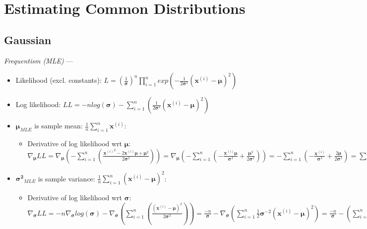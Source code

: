 \section{Estimating Common Distributions}
\subsection*{Gaussian}
\emph{Frequentism (MLE)} --- 
\begin{itemize}
    \item Likelihood (excl. constants): $L = (\frac{1}{\boldsymbol{\sigma}})^n \prod_{i=1}^n exp( -\frac{1}{2\boldsymbol{\sigma}^2} (\boldsymbol{x}^{(i)} - \boldsymbol{\mu} )^2)$
    \item Log likelihood: $LL = -n log(\boldsymbol{\sigma}) - \sum_{i=1}^n (\frac{1}{2\boldsymbol{\sigma}^2} (\boldsymbol{x}^{(i)} - \boldsymbol{\mu} )^2)$
    \item $\boldsymbol{\mu}_{MLE}$ is sample mean: $ \frac{1}{n}\sum_{i=1}^n \boldsymbol{x}^{(i)}$:
    \begin{itemize}
        \item Derivative of log likelihood wrt $\boldsymbol{\mu}$: $\nabla_{\boldsymbol{\mu}} LL = \nabla_{\boldsymbol{\mu}} (- \sum_{i=1}^n (\frac{{\boldsymbol{x}^{(i)}}^2 - 2 \boldsymbol{x}^{(i)} \boldsymbol{\mu} + \boldsymbol{\mu}^2}{2\boldsymbol{\sigma}^2})) = \nabla_{\boldsymbol{\mu}} (- \sum_{i=1}^n (-\frac{ \boldsymbol{x}^{(i)} \boldsymbol{\mu}}{\boldsymbol{\sigma}^2} + \frac{ \boldsymbol{\mu}^2}{2\boldsymbol{\sigma}^2} )) = - \sum_{i=1}^n (-\frac{ \boldsymbol{x}^{(i)}}{\boldsymbol{\sigma}^2} + \frac{ 2\boldsymbol{\mu}}{2\boldsymbol{\sigma}^2} ) =  \sum_{i=1}^n (\frac{ \boldsymbol{x}^{(i)} - \boldsymbol{\mu}}{\boldsymbol{\sigma}^2}) = \sum_{i=1}^n \boldsymbol{x}^{(i)} - n\boldsymbol{\mu} = 0 $
    \end{itemize}
    \item $\boldsymbol{\sigma^2}_{MLE}$ is sample variance: $ \frac{1}{n}\sum_{i=1}^n (\boldsymbol{x}^{(i)} - \boldsymbol{\mu})^2$:
    \begin{itemize}
        \item Derivative of log likelihood wrt $\boldsymbol{\sigma}$: $\nabla_{\boldsymbol{\sigma}} LL = 
        -n \nabla_{\boldsymbol{\sigma}} log(\boldsymbol{\sigma}) -
        \nabla_{\boldsymbol{\sigma}} (\sum_{i=1}^n (\frac{(\boldsymbol{x}^{(i)} - \boldsymbol{\mu} )^2}{2\boldsymbol{\sigma}^2})) =
        \frac{-n}{\boldsymbol{\sigma}} - \nabla_{\boldsymbol{\sigma}} (\sum_{i=1}^n \frac{1}{2} \boldsymbol{\sigma}^{-2} (\boldsymbol{x}^{(i)} - \boldsymbol{\mu} )^2) = \frac{-n}{\boldsymbol{\sigma}} - (\sum_{i=1}^n -1 \boldsymbol{\sigma}^{-3} (\boldsymbol{x}^{(i)} - \boldsymbol{\mu} )^2) = -n + \sum_{i=1}^n (\frac{ (\boldsymbol{x}^{(i)} - \boldsymbol{\mu} )^2 }{ \boldsymbol{\sigma}^{2} })
        = 0 $
    \end{itemize}
\end{itemize}

